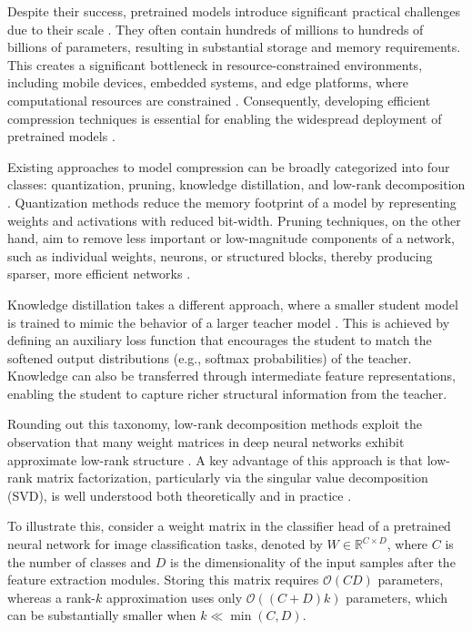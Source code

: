 \documentclass[twoside,leqno,onecolumn]{article}
\begin{document}
Despite their success, pretrained models introduce significant practical challenges due to their scale \cite{tu2024overview,banyongrakkul2025release}. They often contain hundreds of millions to hundreds of billions of parameters, resulting in substantial storage and memory requirements. This creates a significant bottleneck in resource-constrained environments, including mobile devices, embedded systems, and edge platforms, where computational resources are constrained \cite{lin2022device,liu2024lightweight,emami2025llm}. Consequently, developing efficient compression techniques is essential for enabling the widespread deployment of pretrained models \cite{liang2026comprehensive}.


Existing approaches to model compression can be broadly categorized into four classes: quantization, pruning, knowledge distillation, and low-rank decomposition \cite{gupta2022compression,zhu2024survey,saha2024compressing,liu2025survey}. Quantization methods reduce the memory footprint of a model by representing weights and activations with reduced bit-width. Pruning techniques, on the other hand, aim to remove less important or low-magnitude components of a network, such as individual weights, neurons, or structured blocks, thereby producing sparser, more efficient networks \cite{cheng2024survey}.

Knowledge distillation takes a different approach, where a smaller student model is trained to mimic the behavior of a larger teacher model \cite{cho2019efficacy,wang2026end}. This is  achieved by defining an auxiliary loss function that encourages the student to match the softened output distributions (e.g., softmax probabilities) of the teacher. Knowledge can also be transferred through intermediate feature representations, enabling the student to capture richer structural information from the teacher.

Rounding out this taxonomy, low-rank decomposition methods exploit the observation that many weight matrices in deep neural networks exhibit approximate low-rank structure \cite{idelbayev2020low,feng2022rank,thamm2022random}. A key advantage of this approach is that low-rank matrix factorization, particularly via the singular value decomposition (SVD), is well understood both theoretically and in practice \cite{udell2019big}. %

To illustrate this, consider a weight matrix in the classifier head of a pretrained neural network for image classification tasks, denoted by $W \in \mathbb{R}^{C \times D}$, where $C$ is the number of classes and $D$ is the dimensionality of the input samples after the feature extraction modules. Storing this matrix requires $\mathcal{O}(CD)$ parameters, whereas a rank-$k$ approximation uses only $\mathcal{O}((C + D)k)$ parameters, which can be substantially smaller when $k \ll \min(C, D)$.
\end{document}
